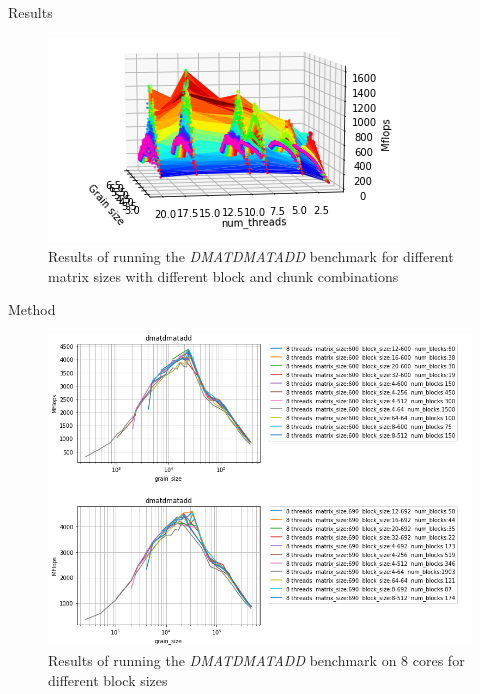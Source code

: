 \documentclass[10pt]{beamer}
\begin{document}
\begin{frame}{Results}
	\begin{outline}
		\begin{figure}
			\includegraphics[width=0.9\linewidth]{figures/grain_size_marvin_color.png}	
			\caption{Results of running the \textit{DMATDMATADD} benchmark for different matrix sizes with different block and chunk combinations}	
		\end{figure}
	\end{outline}
\end{frame}

\begin{frame}{Method}
	\begin{outline}
			\begin{figure}
			\includegraphics[width=0.9\linewidth]{figures/mflop_2.png}	
			\caption{Results of running the \textit{DMATDMATADD} benchmark on 8 cores for different block sizes}	
		\end{figure}
	\end{outline}
\end{frame}
\end{document}
